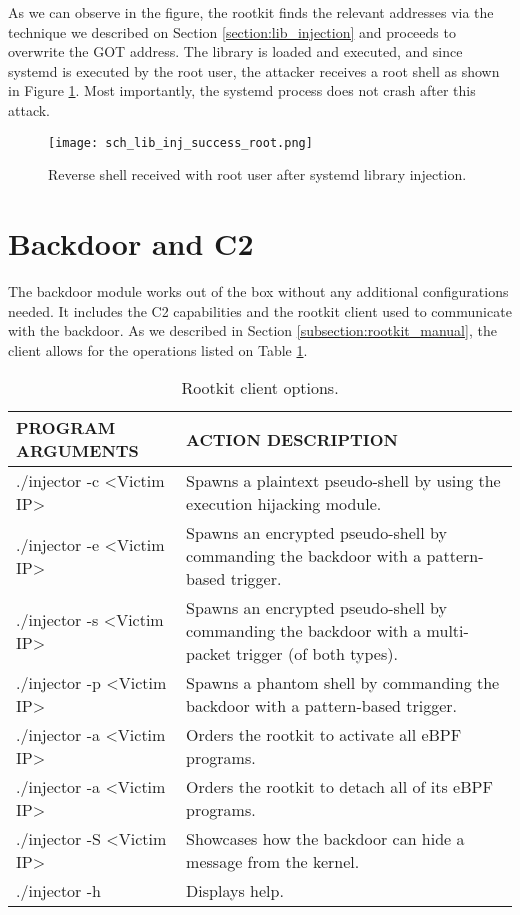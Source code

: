 As we can observe in the figure, the rootkit finds the relevant addresses via the technique we described on Section \ref{section:lib_injection} and proceeds to overwrite the GOT address. The library is loaded and executed, and since systemd is executed by the root user, the attacker receives a root shell as shown in Figure \ref{fig:lib_inj_success_root}. Most importantly, the systemd process does not crash after this attack.

\begin{figure}[htbp]
	\centering
	\texttt{[image: sch\_lib\_inj\_success\_root.png]}
	\caption{Reverse shell received with root user after systemd library injection.}
	\label{fig:lib_inj_success_root}
\end{figure}


\section{Backdoor and C2}
The backdoor module works out of the box without any additional configurations needed. It includes the C2 capabilities and the rootkit client used to communicate with the backdoor. As we described in Section \ref{subsection:rootkit_manual}, the client allows for the operations listed on Table \ref{table:rootkit_client_actions}.

\begin{table}[htbp]
\begin{tabular}{|>{\centering\arraybackslash}p{5cm}|>{\centering\arraybackslash}p{8.5cm}|}
\hline
\textbf{PROGRAM ARGUMENTS} & \textbf{ACTION DESCRIPTION}\\
\hline
\hline
./injector -c <Victim IP> & Spawns a plaintext pseudo-shell by using the execution hijacking module.\\
\hline
./injector -e <Victim IP> & Spawns an encrypted pseudo-shell by commanding the backdoor with a pattern-based trigger.\\
\hline
./injector -s <Victim IP> & Spawns an encrypted pseudo-shell by commanding the backdoor with a multi-packet trigger (of both types).\\
\hline
./injector -p <Victim IP> & Spawns a phantom shell by commanding the backdoor with a pattern-based trigger.\\
\hline
./injector -a <Victim IP> & Orders the rootkit to activate all eBPF programs.\\
\hline
./injector -a <Victim IP> & Orders the rootkit to detach all of its eBPF programs.\\
\hline
./injector -S <Victim IP> & Showcases how the backdoor can hide a message from the kernel.\\
\hline
./injector -h & Displays help.\\
\hline
\end{tabular}
\caption{Rootkit client options.}
\label{table:rootkit_client_actions}
\end{table}

